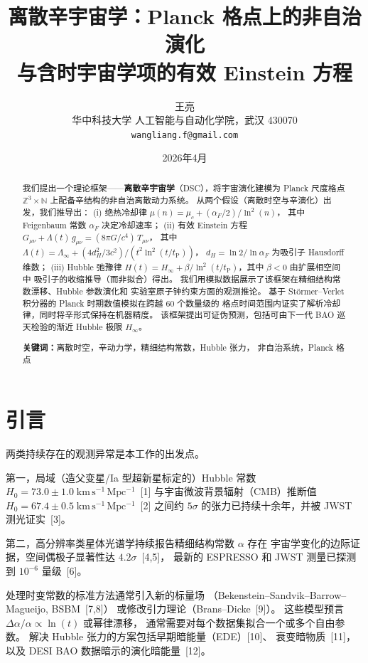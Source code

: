 \documentclass[a4paper,11pt]{article}
\title{\textbf{离散辛宇宙学：Planck 格点上的非自治演化\\[6pt]
与含时宇宙学项的有效 Einstein 方程}}
\author{王亮\\[4pt]
\small 华中科技大学 人工智能与自动化学院，武汉 430070\\
\small \texttt{wangliang.f@gmail.com}}
\date{2026年4月}
\theoremstyle{plain}
\newcommand{\lnq}{\ln^2}
\newcommand{\tP}{t_{\mathrm{P}}}
\newcommand{\Hinf}{H_{\infty}}
\newcommand{\ZZ}{\mathbb{Z}}
\newcommand{\NN}{\mathbb{N}}
\begin{document}
\maketitle

\begin{abstract}
我们提出一个理论框架——\textbf{离散辛宇宙学}（DSC），将宇宙演化建模为
Planck 尺度格点 $\ZZ^3 \times \NN$ 上配备辛结构的非自治离散动力系统。
从两个假设（离散时空与辛演化）出发，我们推导出：
(i) 绝热冷却律 $\mu(n) = \mu_c + (\alpha_F/2)/\lnq(n)$，
其中 Feigenbaum 常数 $\alpha_F$ 决定冷却速率；
(ii) 有效 Einstein 方程
$G_{\mu\nu} + \Lambda(t)\,g_{\mu\nu} = (8\pi G/c^4)\,T_{\mu\nu}$，
其中 $\Lambda(t) = \Lambda_\infty + (4d_H^2/3c^2)/(t^2\lnq(t/\tP))$，
$d_H = \ln 2/\ln\alpha_F$ 为吸引子 Hausdorff 维数；
(iii) Hubble 弛豫律
$H(t) = \Hinf + \beta/\lnq(t/\tP)$，其中 $\beta < 0$ 由扩展相空间中
吸引子的收缩推导（而非拟合）得出。
我们用模拟数据展示了该框架在精细结构常数漂移、Hubble 参数演化和
实验室原子钟约束方面的观测推论。
基于 St\"ormer--Verlet 积分器的 Planck 时期数值模拟在跨越 60 个数量级的
格点时间范围内证实了解析冷却律，同时将辛形式保持在机器精度。
该框架提出可证伪预测，包括可由下一代 BAO 巡天检验的渐近 Hubble 极限 $\Hinf$。

\medskip
\noindent\textbf{关键词：}离散时空，辛动力学，精细结构常数，Hubble 张力，
非自治系统，Planck 格点
\end{abstract}

\section{引言}\label{sec:intro}

两类持续存在的观测异常是本工作的出发点。

第一，局域（造父变星/Ia 型超新星标定的）Hubble 常数
$H_0 = 73.0 \pm 1.0\;\mathrm{km\,s^{-1}\,Mpc^{-1}}$~[1]
与宇宙微波背景辐射（CMB）推断值
$H_0 = 67.4 \pm 0.5\;\mathrm{km\,s^{-1}\,Mpc^{-1}}$~[2]
之间约 $5\sigma$ 的张力已持续十余年，并被 JWST 测光证实~[3]。

第二，高分辨率类星体光谱学持续报告精细结构常数 $\alpha$ 存在
宇宙学变化的边际证据，空间偶极子显著性达 $4.2\sigma$~[4,5]，
最新的 ESPRESSO 和 JWST 测量已探测到 $10^{-6}$ 量级~[6]。

处理时变常数的标准方法通常引入新的标量场
（Bekenstein--Sandvik--Barrow--Magueijo, BSBM~[7,8]）
或修改引力理论（Brans--Dicke~[9]）。
这些模型预言 $\Delta\alpha/\alpha \propto \ln(t)$ 或幂律漂移，
通常需要对每个数据集拟合一个或多个自由参数。
解决 Hubble 张力的方案包括早期暗能量（EDE）[10]、
衰变暗物质~[11]，以及 DESI BAO 数据暗示的演化暗能量~[12]。
\end{document}
